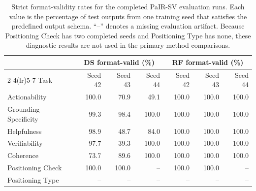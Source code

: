 \begin{table}[t]
\centering
\small
\setlength{\tabcolsep}{5pt}
\begin{tabular}{lrrr rrr}
\toprule
& \multicolumn{3}{c}{DS format-valid (\%)}
& \multicolumn{3}{c}{RF format-valid (\%)} \\
\cmidrule(lr){2-4}\cmidrule(lr){5-7}
Task & Seed 42 & Seed 43 & Seed 44 & Seed 42 & Seed 43 & Seed 44 \\
\midrule
Actionability         & 100.0 & 70.9 & 49.1  & 100.0 & 100.0 & 100.0 \\
Grounding Specificity & 99.3  & 98.4 & 100.0 & 100.0 & 100.0 & 100.0 \\
Helpfulness           & 98.9  & 48.7 & 84.0  & 100.0 & 100.0 & 100.0 \\
Verifiability         & 97.7  & 39.3 & 100.0 & 100.0 & 100.0 & 100.0 \\
Coherence             & 73.7  & 89.6 & 100.0 & 100.0 & 100.0 & 100.0 \\
Positioning Check     & 100.0 & 100.0 & --    & 100.0 & 100.0 & -- \\
Positioning Type      & --    & --    & --    & --    & --    & -- \\
\bottomrule
\end{tabular}
\caption{Strict format-validity rates for the completed PaIR-SV
evaluation runs. Each value is the percentage of test outputs from one
training seed that satisfies the predefined output schema. ``--'' denotes
a missing evaluation artifact. Because Positioning Check has two completed
seeds and Positioning Type has none, these diagnostic results are not used
in the primary method comparisons.}
\label{tab:ssa-v2-format-validity}
\end{table}
